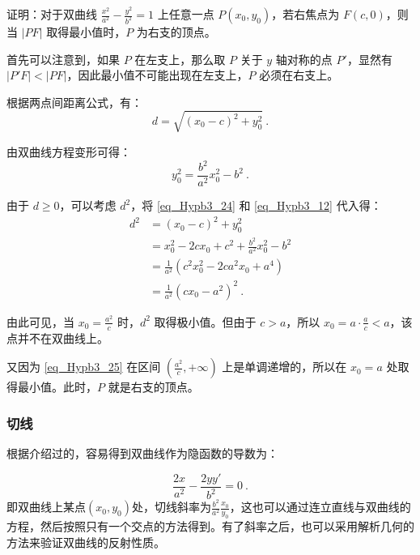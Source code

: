 \begin{example}{证明：对于双曲线 $\displaystyle\frac{x^2}{a^2} - \frac{y^2}{b^2} = 1$ 上任意一点 $P(x_0, y_0)$，若右焦点为 $F(c, 0)$，则当 $|PF|$ 取得最小值时，$P$ 为右支的顶点。}

首先可以注意到，如果 $P$ 在左支上，那么取 $P$ 关于 $y$ 轴对称的点 $P'$，显然有 $|P'F| < |PF|$，因此最小值不可能出现在左支上，$P$ 必须在右支上。

根据两点间距离公式，有：
\begin{equation}
d=\sqrt{(x_0-c)^2+y_0^2}~.
\end{equation}

由双曲线方程变形可得：
\begin{equation}\label{eq_Hypb3_24}
y_0^2 = \frac{b^2}{a^2}x_0^2 - b^2~.
\end{equation}

由于 $d \geq 0$，可以考虑 $d^2$，将 \autoref{eq_Hypb3_24} 和 \autoref{eq_Hypb3_12} 代入得：
\begin{equation}\label{eq_Hypb3_25}
\begin{split}
d^2 &= (x_0 - c)^2 + y_0^2 \\
&= x_0^2 - 2cx_0 + c^2 + \frac{b^2}{a^2}x_0^2 - b^2 \\
&= \frac{1}{a^2} \left( c^2x_0^2 - 2ca^2x_0 + a^4 \right) \\
&= \frac{1}{a^2} \left( cx_0 - a^2 \right)^2~.
\end{split}
\end{equation}

由此可见，当 $\displaystyle x_0 = \frac{a^2}{c}$ 时，$d^2$ 取得极小值。但由于 $c > a$，所以 $\displaystyle x_0 = a \cdot \frac{a}{c} < a$，该点并不在双曲线上。

又因为 \autoref{eq_Hypb3_25} 在区间 $\left( \displaystyle\frac{a^2}{c}, +\infty \right)$ 上是单调递增的，所以在 $x_0 = a$ 处取得最小值。此时，$P$ 就是右支的顶点。
\end{example}

\subsubsection{切线}

根据介绍过的，容易得到双曲线作为隐函数的导数为：

\begin{equation}
\frac{2x}{a^2} - \frac{2yy'}{b^2} = 0~.
\end{equation}
即双曲线上某点$(x_0,y_0)$处，切线斜率为$\displaystyle\frac{b^2}{a^2}\frac{x_0}{y_0}$，这也可以通过连立直线与双曲线的方程，然后按照只有一个交点的方法得到。有了斜率之后，也可以采用解析几何的方法来验证双曲线的反射性质。

